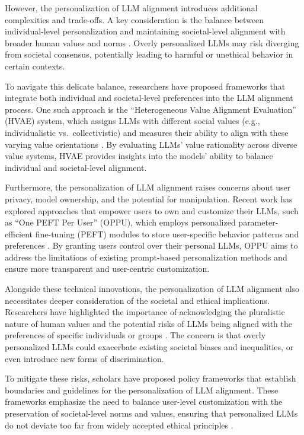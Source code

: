 \documentclass[11pt]{article}
\begin{document}
However, the personalization of LLM alignment introduces additional complexities and trade-offs. A key consideration is the balance between individual-level personalization and maintaining societal-level alignment with broader human values and norms \cite{ref163}. Overly personalized LLMs may risk diverging from societal consensus, potentially leading to harmful or unethical behavior in certain contexts.

To navigate this delicate balance, researchers have proposed frameworks that integrate both individual and societal-level preferences into the LLM alignment process. One such approach is the ``Heterogeneous Value Alignment Evaluation'' (HVAE) system, which assigns LLMs with different social values (e.g., individualistic vs.~collectivistic) and measures their ability to align with these varying value orientations \cite{ref162}. By evaluating LLMs' value rationality across diverse value systems, HVAE provides insights into the models' ability to balance individual and societal-level alignment.

Furthermore, the personalization of LLM alignment raises concerns about user privacy, model ownership, and the potential for manipulation. Recent work has explored approaches that empower users to own and customize their LLMs, such as ``One PEFT Per User'' (OPPU), which employs personalized parameter-efficient fine-tuning (PEFT) modules to store user-specific behavior patterns and preferences \cite{ref205}. By granting users control over their personal LLMs, OPPU aims to address the limitations of existing prompt-based personalization methods and ensure more transparent and user-centric customization.

Alongside these technical innovations, the personalization of LLM alignment also necessitates deeper consideration of the societal and ethical implications. Researchers have highlighted the importance of acknowledging the pluralistic nature of human values and the potential risks of LLMs being aligned with the preferences of specific individuals or groups \cite{ref163}. The concern is that overly personalized LLMs could exacerbate existing societal biases and inequalities, or even introduce new forms of discrimination.

To mitigate these risks, scholars have proposed policy frameworks that establish boundaries and guidelines for the personalization of LLM alignment. These frameworks emphasize the need to balance user-level customization with the preservation of societal-level norms and values, ensuring that personalized LLMs do not deviate too far from widely accepted ethical principles \cite{ref163}.
\end{document}
